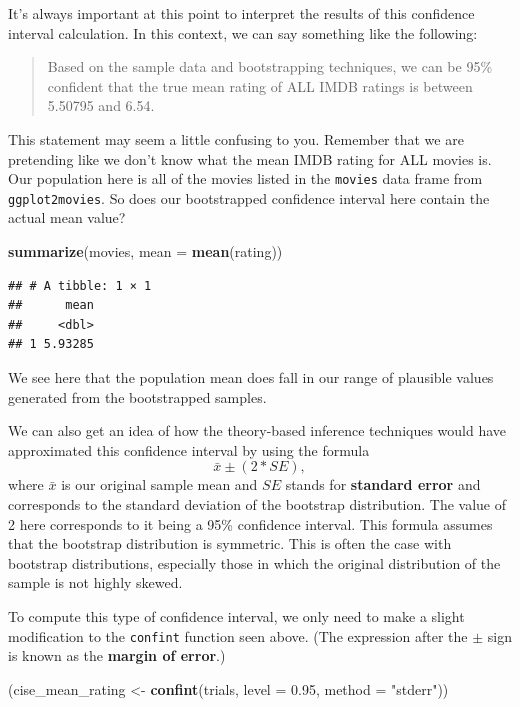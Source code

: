 \documentclass[]{tufte-book}
\newenvironment{Shaded}{\begin{snugshade}}{\end{snugshade}}
\newcommand{\KeywordTok}[1]{\textcolor[rgb]{0.13,0.29,0.53}{\textbf{{#1}}}}
\newcommand{\DataTypeTok}[1]{\textcolor[rgb]{0.13,0.29,0.53}{{#1}}}
\newcommand{\FloatTok}[1]{\textcolor[rgb]{0.00,0.00,0.81}{{#1}}}
\newcommand{\StringTok}[1]{\textcolor[rgb]{0.31,0.60,0.02}{{#1}}}
\newcommand{\NormalTok}[1]{{#1}}
\begin{document}
It's always important at this point to interpret the results of this
confidence interval calculation. In this context, we can say something
like the following:

\begin{quote}
Based on the sample data and bootstrapping techniques, we can be 95\%
confident that the true mean rating of ALL IMDB ratings is between
5.50795 and 6.54.
\end{quote}

This statement may seem a little confusing to you. Remember that we are
pretending like we don't know what the mean IMDB rating for ALL movies
is. Our population here is all of the movies listed in the
\texttt{movies} data frame from \texttt{ggplot2movies}. So does our
bootstrapped confidence interval here contain the actual mean value?

\begin{Shaded}
\begin{Highlighting}[]
\KeywordTok{summarize}\NormalTok{(movies, }\DataTypeTok{mean =} \KeywordTok{mean}\NormalTok{(rating))}
\end{Highlighting}
\end{Shaded}

\begin{verbatim}
## # A tibble: 1 × 1
##      mean
##     <dbl>
## 1 5.93285
\end{verbatim}

We see here that the population mean does fall in our range of plausible
values generated from the bootstrapped samples.

We can also get an idea of how the theory-based inference techniques
would have approximated this confidence interval by using the formula
\[\bar{x} \pm (2 * SE),\] where \(\bar{x}\) is our original sample mean
and \(SE\) stands for \textbf{standard error} and corresponds to the
standard deviation of the bootstrap distribution. The value of 2 here
corresponds to it being a 95\% confidence interval. This formula assumes
that the bootstrap distribution is symmetric. This is often the case
with bootstrap distributions, especially those in which the original
distribution of the sample is not highly skewed.

To compute this type of confidence interval, we only need to make a
slight modification to the \texttt{confint} function seen above. (The
expression after the \(\pm\) sign is known as the \textbf{margin of
error}.)

\begin{Shaded}
\begin{Highlighting}[]
\NormalTok{(cise_mean_rating <-}\StringTok{ }\KeywordTok{confint}\NormalTok{(trials, }\DataTypeTok{level =} \FloatTok{0.95}\NormalTok{, }\DataTypeTok{method =} \StringTok{"stderr"}\NormalTok{))}
\end{Highlighting}
\end{Shaded}
\end{document}
